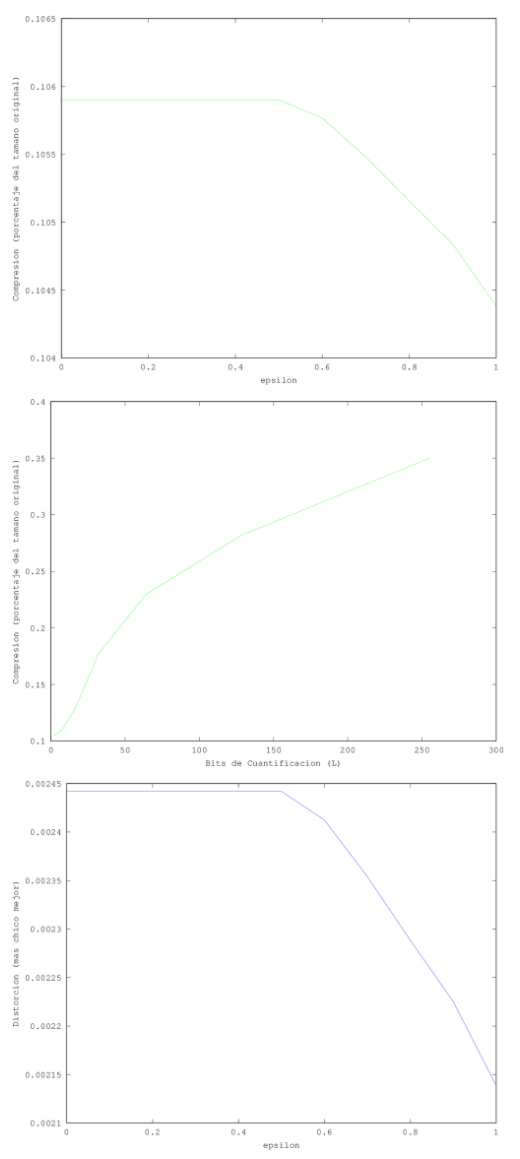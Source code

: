 \documentclass[a4paper,11pt]{article}
\begin{document}
\includegraphics[scale=0.8]{compresion_media_fixed_bits.png}
\includegraphics[scale=0.8]{compresion_media_fixed_epsilon.png}
\includegraphics[scale=0.8]{distorcion_media_fixed_bits.png}
\end{document}
